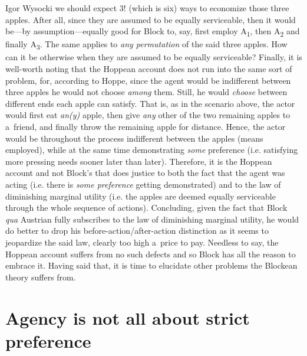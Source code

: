 \begin{artengenv}{Igor Wysocki}
 we should expect 3! (which is six) ways to economize those three apples. After all, since they are assumed to be equally serviceable, then it would be---by assumption---equally good for Block to, say, first employ A\textsubscript{1}, then A\textsubscript{2} and finally A\textsubscript{3}. The same applies to \textit{any permutation} of the said three apples. How can it be otherwise when they are assumed to be equally serviceable? Finally, it is well-worth noting that the Hoppean account does not run into the same sort of problem, for, according to Hoppe, since the agent would be indifferent between three apples he would not choose \textit{among} them. Still, he would \textit{choose} between different ends each apple can satisfy. That is, as in the scenario above, the actor would first eat \textit{an(y)} apple, then give \textit{any} other of the two remaining apples to a~friend, and finally throw the remaining apple for distance. Hence, the actor would be throughout the process indifferent between the apples (means employed), while at the same time demonstrating \textit{some} preference (i.e. satisfying more pressing needs sooner later than later). Therefore, it is the Hoppean account and not Block's that does justice to both the fact that the agent was acting (i.e. there is \textit{some preference} getting demonstrated) and to the law of diminishing marginal utility (i.e. the apples are deemed equally serviceable through the whole sequence of actions). Concluding, given the fact that Block \textit{qua} Austrian fully subscribes to the law of diminishing marginal utility, he would do better to drop his before-action/after-action distinction as it seems to jeopardize the said law, clearly too high a~price to pay. Needless to say, the Hoppean account suffers from no such defects and so Block has all the reason to embrace it. Having said that, it is time to elucidate other problems the Blockean theory suffers from.



\section{Agency is not all about strict preference}


\end{artengenv}
